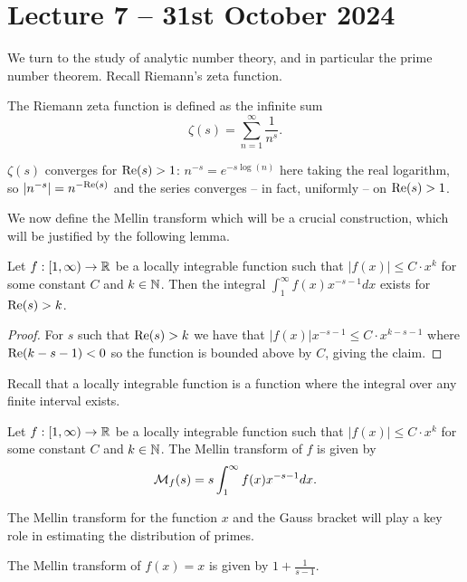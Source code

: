 \section{Lecture 7 -- 31st October 2024}\label{sec: lecture 7}
We turn to the study of analytic number theory, and in particular the prime number theorem. Recall Riemann's zeta function. 
\begin{definition}\label{def: Riemann zeta function}
    The Riemann zeta function is defined as the infinite sum 
    $$\zeta(s)=\sum_{n=1}^{\infty}\frac{1}{n^{s}}.$$
\end{definition}
\begin{remark}
    $\zeta(s)$ converges for $\mathrm{Re}(s)>1$: $n^{-s}=e^{-s\log(n)}$ here taking the real logarithm, so $|n^{-s}|=n^{-\mathrm{Re}(s)}$ and the series converges -- in fact, uniformly -- on $\mathrm{Re}(s)>1$. 
\end{remark}
We now define the Mellin transform which will be a crucial construction, which will be justified by the following lemma. 
\begin{lemma}\label{lem: Mellin transform existence conditions}
    Let $f:[1,\infty)\to\mathbb{R}$ be a locally integrable function such that $|f(x)|\leq C\cdot x^{k}$ for some constant $C$ and $k\in\mathbb{N}$. Then the integral $\int_{1}^{\infty}f(x)x^{-s-1}dx$ exists for $\mathrm{Re}(s)>k$. 
\end{lemma}
\begin{proof}
    For $s$ such that $\mathrm{Re}(s)>k$ we have that $|f(x)|x^{-s-1}\leq C\cdot x^{k-s-1}$ where $\mathrm{Re}(k-s-1)<0$ so the function is bounded above by $C$, giving the claim. 
\end{proof}
\begin{remark}
    Recall that a locally integrable function is a function where the integral over any finite interval exists. 
\end{remark}
\begin{definition}\label{def: Mellin transform}
    Let $f:[1,\infty)\to\mathbb{R}$ be a locally integrable function such that $|f(x)|\leq C\cdot x^{k}$ for some constant $C$ and $k\in\mathbb{N}$. The Mellin transform of $f$ is given by 
    $$\mathcal{M}_{f}(s)=s\int_{1}^{\infty}f(x)x^{-s-1}dx.$$
\end{definition}
The Mellin transform for the function $x$ and the Gauss bracket will play a key role in estimating the distribution of primes. 
\begin{lemma}\label{lem: Mellin transform of x}
    The Mellin transform of $f(x)=x$ is given by $1+\frac{1}{s-1}$. 
\end{lemma}
